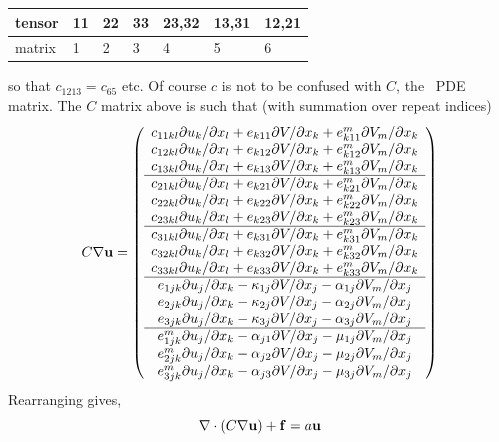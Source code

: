 \documentclass[a4paper,twoside,11pt]{book}
\begin{document}
\vspace{0.5cm}
\begin{tabular}{l|llllll}
  tensor & 11 & 22 & 33 & 23,32 & 13,31 & 12,21\\ \hline
  matrix & 1 & 2 & 3 & 4 & 5 & 6
\end{tabular}
\vspace{0.5cm}

so that $c_{1213}=c_{65}$ etc. Of course $c$ is not to be confused
with $C$, the \zinc\ PDE matrix. The $C$ matrix above is such that (with summation over repeat indices)
\begin{equation}
  C\grad \vec u=
  \left(\begin{array}{c}
c_{11kl}{\d u_{k}/\d x_l}+e_{k11}{\d V/\d x_k}+e^m_{k11}{\d V_m/\d x_k}\\
c_{12kl}{\d u_{k}/\d x_l}+e_{k12}{\d V/\d x_k}+e^m_{k12}{\d V_m/\d x_k}\\
c_{13kl}{\d u_{k}/\d x_l}+e_{k13}{\d V/\d x_k}+e^m_{k13}{\d V_m/\d x_k}\\ \hline
%
c_{21kl}{\d u_{k}/\d x_l}+e_{k21}{\d V/\d x_k}+e^m_{k21}{\d V_m/\d x_k}\\
c_{22kl}{\d u_{k}/\d x_l}+e_{k22}{\d V/\d x_k}+e^m_{k22}{\d V_m/\d x_k}\\
c_{23kl}{\d u_{k}/\d x_l}+e_{k23}{\d V/\d x_k}+e^m_{k23}{\d V_m/\d x_k}\\ \hline
%
c_{31kl}{\d u_{k}/\d x_l}+e_{k31}{\d V/\d x_k}+e^m_{k31}{\d V_m/\d x_k}\\
c_{32kl}{\d u_{k}/\d x_l}+e_{k32}{\d V/\d x_k}+e^m_{k32}{\d V_m/\d x_k}\\
c_{33kl}{\d u_{k}/\d x_l}+e_{k33}{\d V/\d x_k}+e^m_{k33}{\d V_m/\d x_k}\\ \hline
%
e_{1jk}{\d u_j/\d x_k}-\kappa_{1j} {\d V/\d x_j}-\alpha_{1j}{\d V_m/\d x_j}\\
e_{2jk}{\d u_j/\d x_k}-\kappa_{2j} {\d V/\d x_j}-\alpha_{2j}{\d V_m/\d x_j}\\
e_{3jk}{\d u_j/\d x_k}-\kappa_{3j} {\d V/\d x_j}-\alpha_{3j}{\d V_m/\d x_j}\\ \hline
%
e^m_{1jk}{\d u_j/\d x_k}-\alpha_{j1} {\d V/\d x_j}-\mu_{1j}{\d V_m/\d x_j}\\
e^m_{2jk}{\d u_j/\d x_k}-\alpha_{j2} {\d V/\d x_j}-\mu_{2j}{\d V_m/\d x_j}\\
e^m_{3jk}{\d u_j/\d x_k}-\alpha_{j3} {\d V/\d x_j}-\mu_{3j}{\d V_m/\d x_j}
  \end{array}\right)
  \label{pdelhs}
\end{equation}
Rearranging  gives,
\begin{equation}
  \nabla\cdot (C\nabla \mathbf{u}) +\mathbf{f} = a\mathbf{u}
  \label{rearr}
\end{equation}
\end{document}
